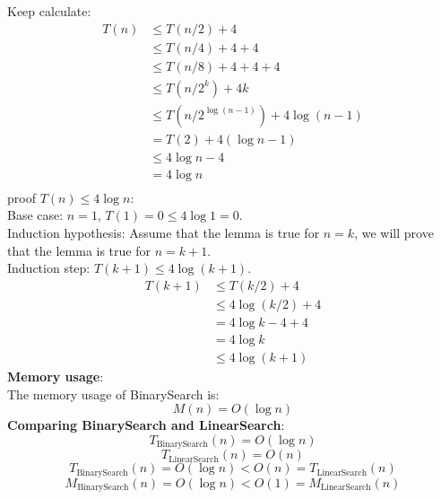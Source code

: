 \documentclass[onecolumn]{report}
\begin{document}
Keep calculate:
\begin{align*}
    T(n) &\leq T(n/2) + 4\\
    &\leq T(n/4) + 4 + 4\\
    &\leq T(n/8) + 4 + 4 + 4\\
    &\leq T(n/2^k) + 4k\\
    &\leq T(n/2^{\log (n-1)}) + 4\log (n-1)\\
    &= T(2) + 4(\log n-1)\\
    &\leq 4\log n - 4\\
    &= 4\log n\\
\end{align*}
proof $T(n) \leq 4\log n$:\\
Base case: $n=1$, $T(1) = 0 \leq 4\log 1 = 0$.\\
Induction hypothesis: Assume that the lemma is true for $n=k$, we will prove that the lemma is true for $n=k+1$.\\
Induction step: $T(k+1) \leq 4\log (k+1)$.\\
\begin{align*}
    T(k+1) &\leq T(k/2) + 4\\
    &\leq 4\log (k/2) + 4\\
    &= 4\log k - 4 + 4\\
    &= 4\log k\\
    &\leq 4\log (k+1)
\end{align*}
\textbf{Memory usage}:\\
The memory usage of BinarySearch is:\\
\begin{equation*}
    M(n) = O(\log n)
\end{equation*}
\textbf{Comparing BinarySearch and LinearSearch}:\\
\begin{equation*}
    T_{\text{BinarySearch}}(n) = O(\log n)
\end{equation*}
\begin{equation*}
    T_{\text{LinearSearch}}(n) = O(n)
\end{equation*}
\begin{equation*}
    T_{\text{BinarySearch}}(n) = O(\log n) < O(n) = T_{\text{LinearSearch}}(n)  
\end{equation*}
\begin{equation*}
    M_{\text{BinarySearch}}(n) = O(\log n) < O(1) = M_{\text{LinearSearch}}(n)
\end{equation*}
\end{document}
